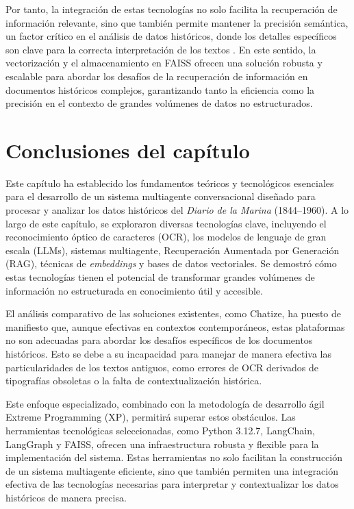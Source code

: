 Por tanto, la integración de estas tecnologías no solo facilita la recuperación de información relevante, sino que también permite mantener la precisión semántica, un factor crítico en el análisis de datos históricos, donde los detalles específicos son clave para la correcta interpretación de los textos \cite{mikolov2013efficient}. En este sentido, la vectorización y el almacenamiento en FAISS ofrecen una solución robusta y escalable para abordar los desafíos de la recuperación de información en documentos históricos complejos, garantizando tanto la eficiencia como la precisión en el contexto de grandes volúmenes de datos no estructurados.


\section*{Conclusiones del capítulo}

Este capítulo ha establecido los fundamentos teóricos y tecnológicos esenciales para el desarrollo de un sistema multiagente conversacional diseñado para procesar y analizar los datos históricos del \textit{Diario de la Marina} (1844--1960). A lo largo de este capítulo, se exploraron diversas tecnologías clave, incluyendo el reconocimiento óptico de caracteres (OCR), los modelos de lenguaje de gran escala (LLMs), sistemas multiagente, Recuperación Aumentada por Generación (RAG), técnicas de \textit{embeddings} y bases de datos vectoriales. Se demostró cómo estas tecnologías tienen el potencial de transformar grandes volúmenes de información no estructurada en conocimiento útil y accesible.

El análisis comparativo de las soluciones existentes, como Chatize, ha puesto de manifiesto que, aunque efectivas en contextos contemporáneos, estas plataformas no son adecuadas para abordar los desafíos específicos de los documentos históricos. Esto se debe a su incapacidad para manejar de manera efectiva las particularidades de los textos antiguos, como errores de OCR derivados de tipografías obsoletas o la falta de contextualización histórica.

Este enfoque especializado, combinado con la metodología de desarrollo ágil Extreme Programming (XP), permitirá superar estos obstáculos. Las herramientas tecnológicas seleccionadas, como Python 3.12.7, LangChain, LangGraph y FAISS, ofrecen una infraestructura robusta y flexible para la implementación del sistema. Estas herramientas no solo facilitan la construcción de un sistema multiagente eficiente, sino que también permiten una integración efectiva de las tecnologías necesarias para interpretar y contextualizar los datos históricos de manera precisa.
